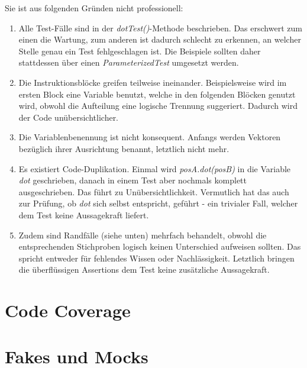 Sie ist aus folgenden Gründen nicht professionell:
\begin{enumerate}
    \item Alle Test-Fälle sind in der \textit{dotTest()}-Methode
    beschrieben. Das erschwert zum einen die Wartung, zum anderen ist
    dadurch schlecht zu erkennen, an welcher Stelle genau ein Test
    fehlgeschlagen ist. Die Beispiele sollten daher stattdessen über
    einen \textit{ParameterizedTest} umgesetzt werden.
    \item Die Instruktionsblöcke greifen teilweise ineinander. 
    Beispielsweise wird im ersten Block eine Variable benutzt, welche
    in den folgenden Blöcken genutzt wird, obwohl die Aufteilung eine
    logische Trennung suggeriert. Dadurch wird der Code
    unübersichtlicher.
    \item Die Variablenbenennung ist nicht konsequent. Anfangs werden
    Vektoren bezüglich ihrer Ausrichtung benannt, letztlich nicht mehr.
    \item Es existiert Code-Duplikation. Einmal wird
    \textit{posA.dot(posB)} in die Variable \textit{dot} geschrieben,
    danach in einem Test aber nochmals komplett ausgeschrieben. Das 
    führt zu Unübersichtlichkeit. Vermutlich hat das auch zur Prüfung,
    ob \textit{dot} sich selbst entspricht, geführt - ein trivialer
    Fall, welcher dem Test keine Aussagekraft liefert.
    \item Zudem sind Randfälle (siehe unten) mehrfach behandelt,
    obwohl die entsprechenden Stichproben logisch keinen Unterschied
    aufweisen sollten. Das spricht entweder für fehlendes Wissen oder
    Nachlässigkeit. Letztlich bringen die überflüssigen Assertions
    dem Test keine zusätzliche Aussagekraft. 
\end{enumerate}

\section{Code Coverage}

\section{Fakes und Mocks}